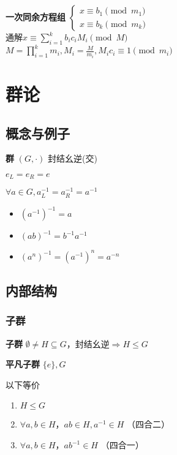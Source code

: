 \documentclass[a4paper,10pt]{ctexart}
\newcommand*{\impl}{\Rightarrow}
\renewcommand*{\leq}{\leqslant}
\begin{document}
\begin{multicols}{3}
    \textbf{一次同余方程组} $\begin{cases}
            x \equiv b_1 \pmod{m_1} \\
            x \equiv b_k \pmod{m_k}
        \end{cases}$\\
    通解$x \equiv \sum_{i=1}^k b_i c_i M_i \pmod{M}$\\
    $M \! = \! \prod\limits_{i=1}^k m_i, M_i \! = \! \frac{M}{m_i}, M_i c_i \equiv 1 \pmod{m_i}$

    \section{群论}

    \subsection{概念与例子}

    \textbf{群} $(G, \cdot)$ 封结幺逆(交)

    \begin{theorem}[幺元性质]
        $e_L = e_R = e$
    \end{theorem}

    \begin{theorem}[逆元性质]
        $\forall a \in G, a_L^{-1} = a_R^{-1} = a^{-1}$

        \begin{itemize}
            \item $(a^{-1})^{-1} = a$
            \item $(ab)^{-1}=b^{-1}a^{-1}$
            \item $(a^n)^{-1}=(a^{-1})^n=a^{-n}$
        \end{itemize}
    \end{theorem}

    \subsection{内部结构}

    \subsubsection{子群}

    \textbf{子群} $\emptyset \!\neq\! H \!\subseteq\! G$，封结幺逆$\impl H \!\leq\! G$

    \textbf{平凡子群} $\{e\}, G$

    \begin{theorem}[子群判则]
        以下等价
        \begin{enumerate}
            \item $H \leq G$
            \item $\forall a, b \!\in\! H$，$ab \!\in\! H, a^{-1} \!\in\! H$ （四合二）
            \item $\forall a, b \!\in\! H$，$ab^{-1} \!\in\! H$ （四合一）
        \end{enumerate}
    \end{theorem}


\end{multicols}
\end{document}
